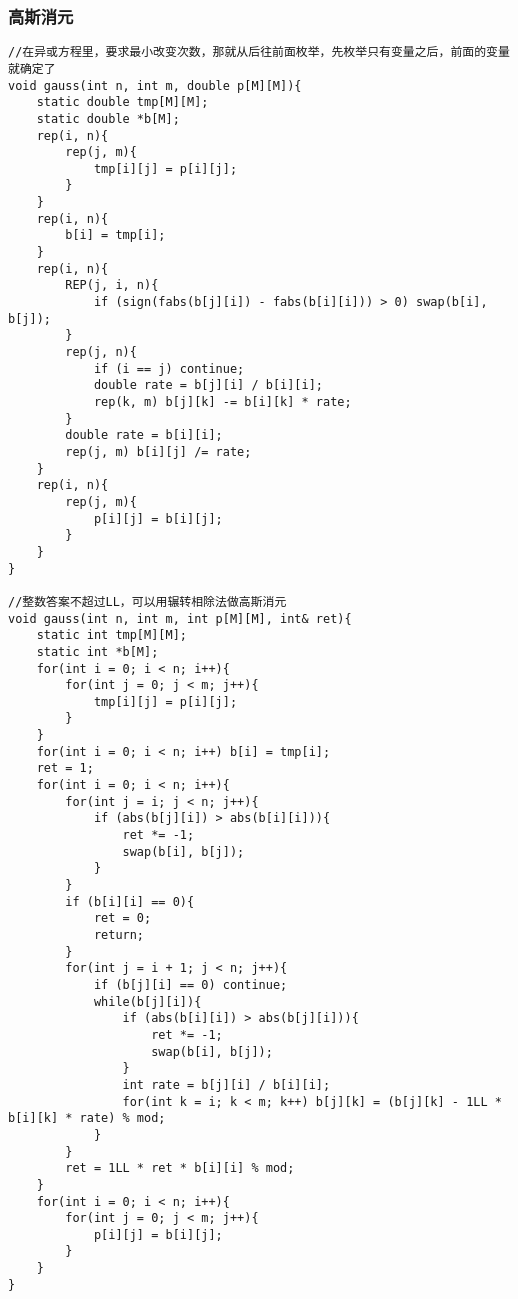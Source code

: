 \subsubsection{高斯消元}
\begin{verbatim}
//在异或方程里，要求最小改变次数，那就从后往前面枚举，先枚举只有变量之后，前面的变量就确定了
void gauss(int n, int m, double p[M][M]){
    static double tmp[M][M];
    static double *b[M];
    rep(i, n){
        rep(j, m){
            tmp[i][j] = p[i][j];
        }
    }
    rep(i, n){
        b[i] = tmp[i];
    }
    rep(i, n){
        REP(j, i, n){
            if (sign(fabs(b[j][i]) - fabs(b[i][i])) > 0) swap(b[i], b[j]);
        }
        rep(j, n){
            if (i == j) continue;
            double rate = b[j][i] / b[i][i];
            rep(k, m) b[j][k] -= b[i][k] * rate;
        }
        double rate = b[i][i];
        rep(j, m) b[i][j] /= rate;
    }
    rep(i, n){
        rep(j, m){
            p[i][j] = b[i][j];
        }
    }
}

//整数答案不超过LL，可以用辗转相除法做高斯消元
void gauss(int n, int m, int p[M][M], int& ret){
    static int tmp[M][M];
    static int *b[M];
    for(int i = 0; i < n; i++){
        for(int j = 0; j < m; j++){
            tmp[i][j] = p[i][j];
        }
    }
    for(int i = 0; i < n; i++) b[i] = tmp[i];
    ret = 1;
    for(int i = 0; i < n; i++){
        for(int j = i; j < n; j++){
            if (abs(b[j][i]) > abs(b[i][i])){
                ret *= -1;
                swap(b[i], b[j]);
            }
        }
        if (b[i][i] == 0){
            ret = 0;
            return;
        }
        for(int j = i + 1; j < n; j++){
            if (b[j][i] == 0) continue;
            while(b[j][i]){
                if (abs(b[i][i]) > abs(b[j][i])){
                    ret *= -1;
                    swap(b[i], b[j]);
                }
                int rate = b[j][i] / b[i][i];
                for(int k = i; k < m; k++) b[j][k] = (b[j][k] - 1LL * b[i][k] * rate) % mod;
            }
        }
        ret = 1LL * ret * b[i][i] % mod;
    }
    for(int i = 0; i < n; i++){
        for(int j = 0; j < m; j++){
            p[i][j] = b[i][j];
        }
    }
}
\end{verbatim}
